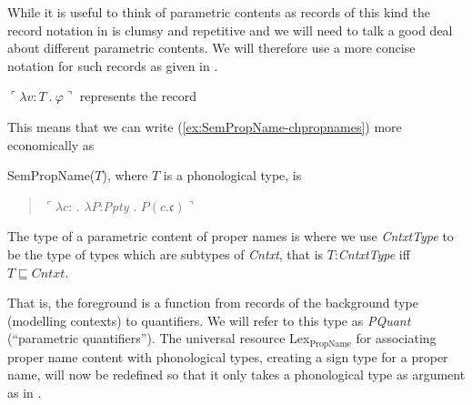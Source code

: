While it is useful to think of parametric contents as records of this
kind the record notation in \preveg{} is clumsy and repetitive and we
will need to talk a good deal about different parametric contents.  We
will therefore use a more concise notation for such records as given
in \nexteg{}.
\begin{ex} 
  $\ulcorner\lambda v\!:\!T\ .\ \varphi\urcorner$ represents the record
  \begin{quote}
  \end{quote}
\label{ex:cornerquote-notation} 
\end{ex}
This means that we can write (\ref{ex:SemPropName-chpropnames}) more
economically as \nexteg{}
\begin{ex} 
SemPropName($T$), where $T$ is a phonological type,
is
\begin{quote}
  $\ulcorner\lambda c$:  . $\lambda
                       P$:\textit{Ppty} . $P(c.\mathfrak{c})\urcorner$
                     \end{quote}
                     
\label{ex:SemPropName-chpropnames-econ} 
\end{ex}
  


The type of a parametric content of proper names is \nexteg{} where we
use \textit{CntxtType} to be the type of types which are subtypes of
\textit{Cntxt}, that is $T$:\textit{CntxtType} iff $T\sqsubseteq\textit{Cntxt}$.
\begin{ex}
\end{ex}
That is, the foreground is a function from
records of the  background type (modelling contexts) to quantifiers.  We will refer to this type as
\textit{PQuant} (``parametric quantifiers'').  The universal resource
Lex$_{\mathrm{PropName}}$ for associating proper name content with
phonological types, creating a sign type for a proper name, will now be
redefined so that it only takes a phonological type as argument as in
\nexteg{}.

